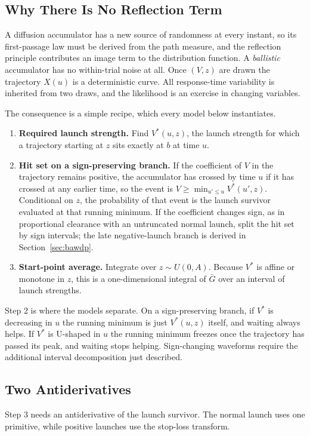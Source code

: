 \documentclass[12pt]{article}
\newcommand{\Gbar}{\bar{G}}
\theoremstyle{remark}
\begin{document}
\subsection{Why There Is No Reflection Term}
\label{sec:ballistic-idea-recipe}
A diffusion accumulator has a new source of randomness at every instant, so its first-passage law must be derived from the path measure, and the reflection principle contributes an image term to the distribution function. A \emph{ballistic} accumulator has no within-trial noise at all. Once $(V,z)$ are drawn the trajectory $X(u)$ is a deterministic curve. All response-time variability is inherited from two draws, and the likelihood is an exercise in changing variables.

The consequence is a simple recipe, which every model below instantiates.

\begin{enumerate}
  \item \textbf{Required launch strength.} Find $V^{*}(u,z)$, the launch strength for which a trajectory starting at $z$ sits exactly at $b$ at time $u$.
  \item \textbf{Hit set on a sign-preserving branch.} If the coefficient of $V$ in the trajectory remains positive, the accumulator has crossed by time $u$ if it has crossed at any earlier time, so the event is $V \ge \min_{u' \le u} V^{*}(u',z)$. Conditional on $z$, the probability of that event is the launch survivor evaluated at that running minimum. If the coefficient changes sign, as in proportional clearance with an untruncated normal launch, split the hit set by sign intervals; the late negative-launch branch is derived in Section~\ref{sec:bawdp}.
  \item \textbf{Start-point average.} Integrate over $z \sim U(0,A)$. Because $V^{*}$ is affine or monotone in $z$, this is a one-dimensional integral of $\Gbar$ over an interval of launch strengths.
\end{enumerate}

Step 2 is where the models separate. On a sign-preserving branch, if $V^{*}$ is decreasing in $u$ the running minimum is just $V^{*}(u,z)$ itself, and waiting always helps. If $V^{*}$ is U-shaped in $u$ the running minimum freezes once the trajectory has passed its peak, and waiting stops helping. Sign-changing waveforms require the additional interval decomposition just described.

\subsection{Two Antiderivatives}
Step 3 needs an antiderivative of the launch survivor. The normal launch uses one primitive, while positive launches use the stop-loss transform.
\end{document}
